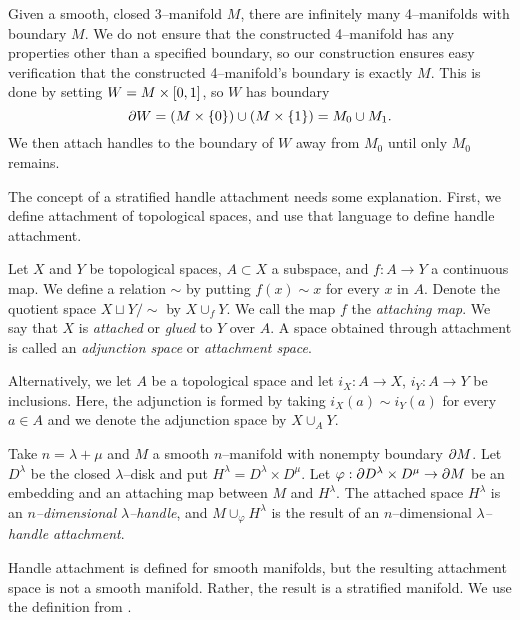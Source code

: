 \label{chapter:problem}

Given a smooth, closed 3--manifold $M$, there are infinitely many 4--manifolds with boundary $M$.
We do not ensure that the constructed 4--manifold has any properties other than a specified boundary, so our construction ensures easy verification that the constructed 4--manifold's boundary is exactly $M$.
This is done by setting $W=M\times [0,1]$, so $W$ has boundary 
\[
	\partial W = (M\times\{0\}) \cup (M\times\{1\}) = M_0 \cup M_1.
\]
We then attach handles to the boundary of $W$ away from $M_0$ until only $M_0$ remains.

The concept of a stratified handle attachment needs some explanation.
First, we define attachment of topological spaces, and use that language to define handle attachment.

\begin{defn}[Attachment]
	Let $X$ and $Y$ be topological spaces, $A\subset X$ a subspace, and $f:A\to Y$ a continuous map.
	We define a relation $\sim$ by putting $f(x)\sim x$ for every $x$ in $A$.
	Denote the quotient space $X\sqcup Y/\sim$ by $X\cup_f Y$.
	We call the map $f$ the \emph{attaching map}.  
	We say that $X$ is \emph{attached} or \emph{glued} to $Y$ over $A$.
	A space obtained through attachment is called an \emph{adjunction space} or \emph{attachment space}.
	
	Alternatively, we let $A$ be a topological space and let $i_X:A\to X$, $i_Y:A\to Y$ be inclusions.
	Here, the adjunction is formed by taking $i_X(a)\sim i_Y(a)$ for every $a\in A$ and we denote the adjunction space by $X\cup_A Y$.
\end{defn}

\begin{defn}[Handle]
	\label{def:handle}
	Take $n=\lambda+\mu$ and $M$ a smooth $n$--manifold with nonempty boundary $\partial M$.
	Let $D^\lambda$ be the closed $\lambda$--disk and put $H^\lambda = D^\lambda\times D^\mu$.
	Let $\varphi:\partial D^\lambda\times D^\mu\to\partial M$ be an embedding and an attaching map between $M$ and $H^\lambda$.
	The attached space $H^\lambda$ is an \emph{$n$--dimensional $\lambda$--handle}, and $M\cup_\varphi H^\lambda$ is the result of an $n$--dimensional \emph{$\lambda$--handle attachment}.
\end{defn}

Handle attachment is defined for smooth manifolds, but the resulting attachment space is not a smooth manifold.
Rather, the result is a stratified manifold.
We use the definition from \cite{wein94}.

